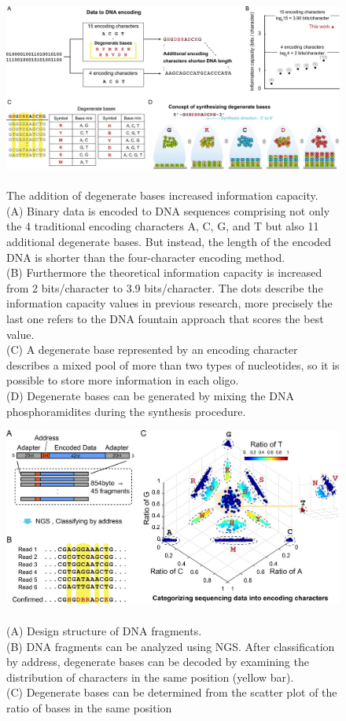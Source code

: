 \documentclass[10pt,twocolumn,twoside]{gsajnl}
\begin{document}
\begin{figure}[h!]
\centering
\includegraphics[width=\linewidth]{image degenerate basis.jpg}
\caption{
\\The addition of degenerate bases increased information capacity.\\
(A) Binary data is encoded to DNA sequences comprising not only the 4 traditional encoding characters A, C, G, and T but also 11 additional degenerate bases. But instead, the length of the encoded DNA is shorter than the four-character encoding method. \\
(B) Furthermore the theoretical information capacity is increased from 2 bits/character to 3.9 bits/character. The dots describe the information capacity values in previous research, more precisely the last one refers to the DNA fountain approach that scores the best value.\\ 
(C) A degenerate base represented by an encoding character describes a mixed pool of more than two types of nucleotides, so it is possible to store more information in each oligo.\\
(D) Degenerate bases can be generated by mixing the DNA phosphoramidites during the synthesis procedure.}
\label{fig:my_label6}
\end{figure}
\begin{figure}[h!]
\centering
\includegraphics[width=\linewidth]{other on degenerate basis.jpg}
\caption{
\\(A) Design structure of DNA fragments. \\(B) DNA fragments can be analyzed using NGS. After classification by address, degenerate bases can be decoded by examining the distribution of characters in the same position (yellow bar). \\(C) Degenerate bases can be determined from the scatter plot of the ratio of bases in the same position}
\label{fig:my_label7}
\end{figure}
\end{document}
